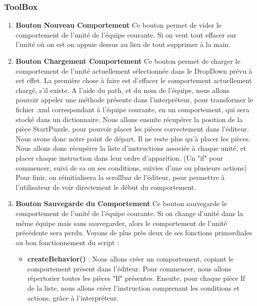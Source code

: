 \documentclass{report}
\begin{document}
\subsubsection{ToolBox}
\begin{enumerate}[label=\Alph*)]
\item\textbf{Bouton Nouveau Comportement} \newline
Ce bouton permet de vider le comportement de l'unité de l'équipe courante. Si on veut tout effacer sur l'unité où on est on appuie dessus au lieu de tout supprimer à la main.
\item\textbf{Bouton Chargement Comportement} \newline
Ce bouton permet de charger le comportement de l'unité actuellement sélectionnée dans le DropDown prévu à cet effet.
La première chose à faire est d'effacer le comportement actuellement chargé, s'il existe.
A l'aide du path, et du nom de l'équipe, nous allons pouvoir appeler une méthode présente dans l’interpréteur, pour transformer le fichier .xml correspondant à l'équipe courante, en un comportement, qui sera stocké dans un dictionnaire.\newline
Nous allons ensuite récupérer la position de la pièce StartPuzzle, pour pouvoir placer les pièces correctement dans l'éditeur. Nous avons donc notre point de départ.\newline 
Il ne reste plus qu'à placer les pièces. Nous allons donc récupérer la liste d'instructions associée à chaque unité, et placer chaque instruction dans leur ordre d'apparition. (Un "if" pour commencer, suivi de sa ou ses conditions, suivies d'une ou plusieurs actions)\newline
Pour finir, on réinitialisera la scrollbar de l'éditeur, pour permettre à l'utilisateur de voir directement le début du comportement.
\item\textbf{Bouton Sauvegarde du Comportement} \newline
Ce bouton sauvegarde le comportement de l'unité de l'équipe courante. Si on change d'unité dans la même équipe mais sans sauvegarder, alors le comportement de l'unité précédente sera perdu.\newline
Voyons de plus près deux de ses fonctions primordiales au bon fonctionnement du script :
\begin{itemize}
\item\textbf{createBehavior()} :  \newline
Nous allons créer un comportement, copiant le comportement présent dans l'éditeur. Pour commencer, nous allons répertorier toutes les pièces "If" présentes. Ensuite, pour chaque pièce If de la liste, nous allons créer l'instruction comprenant les conditions et actions, grâce à l'interpréteur.\newline

\end{itemize}
\end{enumerate}
\end{document}

